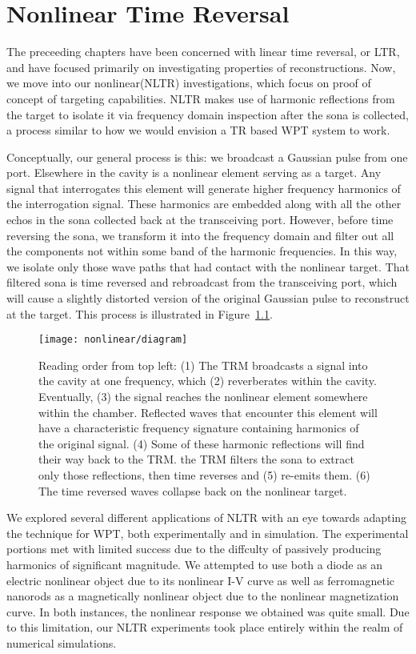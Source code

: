 \chapter{Nonlinear Time Reversal}
\label{ch:nltr}

The preceeding chapters have been concerned with linear time reversal, or LTR, and have focused primarily on investigating properties of reconstructions. Now, we move into our nonlinear(NLTR) investigations, which focus on proof of concept of targeting capabilities. NLTR makes use of harmonic reflections from the target to isolate it via frequency domain inspection after the sona is collected, a process similar to how we would envision a TR based WPT system to work.

Conceptually, our general process is this: we broadcast a Gaussian pulse from one port. Elsewhere in the cavity is a nonlinear element serving as a target. Any signal that interrogates this element will generate higher frequency harmonics of the interrogation signal. These harmonics are embedded along with all the other echos in the sona collected back at the transceiving port. However, before time reversing the sona, we transform it into the frequency domain and filter out all the components not within some band of the harmonic frequencies. In this way, we isolate only those wave paths that had contact with the nonlinear target. That filtered sona is time reversed and rebroadcast from the transceiving port, which will cause a slightly distorted version of the original Gaussian pulse to reconstruct at the target. This process is illustrated in Figure~\ref{fig:nonlinear-diagram}.

\begin{figure}[]
\centering
\texttt{[image: nonlinear/diagram]}
    \caption[Conceptual overview of nonlinear time reversal]{Reading order from top left: (1) The TRM broadcasts a signal into the cavity at one frequency, which (2) reverberates within the cavity. Eventually, (3) the signal reaches the nonlinear element somewhere within the chamber. Reflected waves that encounter this element will have a characteristic frequency signature containing harmonics of the original signal. (4) Some of these harmonic reflections will find their way back to the TRM. the TRM filters the sona to extract only those reflections, then time reverses and (5) re-emits them. (6) The time reversed waves collapse back on the nonlinear target.}
    \label{fig:nonlinear-diagram}
\end{figure}

We explored several different applications of NLTR with an eye towards adapting the technique for WPT, both experimentally and in simulation. The experimental portions met with limited success due to the diffculty of passively producing harmonics of significant magnitude. We attempted to use both a diode as an electric nonlinear object due to its nonlinear I-V curve as well as ferromagnetic nanorods as a magnetically nonlinear object due to the nonlinear magnetization curve. In both instances, the nonlinear response we obtained was quite small. Due to this limitation, our NLTR experiments took place entirely within the realm of numerical simulations. 
